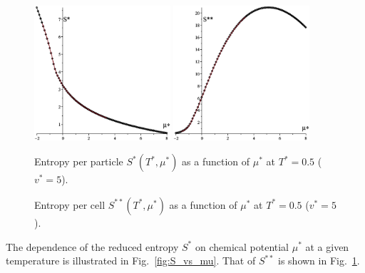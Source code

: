 \documentclass[12pt]{article}
\numberwithin{equation}{section}
\begin{document}
	\begin{figure}[htbp]
		\includegraphics[width=0.45\textwidth,angle=0]{S_vs_mu}
		\hfill
		\includegraphics[width=0.45\textwidth,angle=0]{SS_vs_mu}
		\\
		\parbox{0.45\textwidth}{\caption{\label{fig:S_vs_mu} Entropy per particle $S^{*}(T^*,\mu^*)$ as a function of $\mu^*$ at $T^*=0.5$ ($v^* = 5$).}}
		\hfill
		\parbox{0.45\textwidth}{\caption{\label{fig:SS_vs_mu} Entropy per cell $S^{**}(T^*,\mu^*)$ as a function of $\mu^*$ at $T^*=0.5$ ($v^* = 5$).}}
	\end{figure}
	
	The dependence of the reduced entropy $S^*$ on chemical potential $\mu^*$ at a given temperature is illustrated in Fig.~\ref{fig:S_vs_mu}. That of $S^{**}$ is shown in Fig.~\ref{fig:SS_vs_mu}.
	
\end{document}
